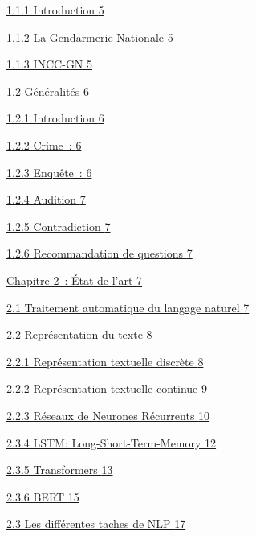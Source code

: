\documentclass[
]{article}
\begin{document}
\hyperref[introduction]{1.1.1 Introduction \hyperref[introduction]{5}}

\hyperref[la-gendarmerie-nationale]{1.1.2 La Gendarmerie Nationale
\hyperref[la-gendarmerie-nationale]{5}}

\hyperref[incc-gn]{1.1.3 INCC-GN \hyperref[incc-gn]{5}}

\hyperref[guxe9nuxe9ralituxe9s]{1.2 Généralités
\hyperref[guxe9nuxe9ralituxe9s]{6}}

\hyperref[introduction-1]{1.2.1 Introduction
\hyperref[introduction-1]{6}}

\hyperref[crime]{1.2.2 Crime~: \hyperref[crime]{6}}

\hyperref[enquuxeate]{1.2.3 Enquête~: \hyperref[enquuxeate]{6}}

\hyperref[audition]{1.2.4 Audition \hyperref[audition]{7}}

\hyperref[contradiction]{1.2.5 Contradiction
\hyperref[contradiction]{7}}

\hyperref[recommandation-de-questions]{1.2.6 Recommandation de questions
\hyperref[recommandation-de-questions]{7}}

\hyperref[chapitre-2-uxe9tat-de-lart]{Chapitre 2~: État de l'art
\hyperref[chapitre-2-uxe9tat-de-lart]{7}}

\hyperref[traitement-automatique-du-langage-naturel]{2.1 Traitement
automatique du langage naturel
\hyperref[traitement-automatique-du-langage-naturel]{7}}

\hyperref[repruxe9sentation-du-texte]{2.2 Représentation du texte
\hyperref[repruxe9sentation-du-texte]{8}}

\hyperref[_Toc167600292]{2.2.1 Représentation textuelle discrète
\hyperref[_Toc167600292]{8}}

\hyperref[repruxe9sentation-textuelle-continue]{2.2.2 Représentation
textuelle continue \hyperref[repruxe9sentation-textuelle-continue]{9}}

\hyperref[ruxe9seaux-de-neurones-ruxe9currents]{2.2.3 Réseaux de
Neurones Récurrents \hyperref[ruxe9seaux-de-neurones-ruxe9currents]{10}}

\hyperref[lstm-long-short-term-memory]{2.3.4 LSTM:
Long-Short-Term-Memory \hyperref[lstm-long-short-term-memory]{12}}

\hyperref[structure-des-cellules-lstm]{2.3.5 Transformers
\hyperref[structure-des-cellules-lstm]{13}}

\hyperref[encodeur-et-duxe9codeur]{2.3.6 BERT
\hyperref[encodeur-et-duxe9codeur]{15}}

\hyperref[les-diffuxe9rentes-taches-de-nlp]{2.3 Les différentes taches
de NLP \hyperref[les-diffuxe9rentes-taches-de-nlp]{17}}
\end{document}
